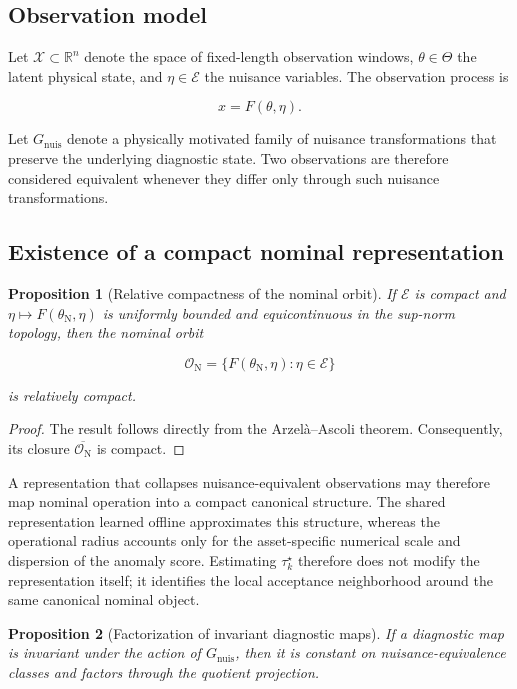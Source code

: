 \documentclass[11pt,a4paper]{article}
\newtheorem{proposition}{Proposition}
\newcommand{\X}{\ensuremath{\mathcal{X}}}
\newcommand{\ThetaSpace}{\ensuremath{\Theta}}
\newcommand{\EtaSpace}{\ensuremath{\mathcal{E}}}
\newcommand{\Gnuis}{\ensuremath{G_{\mathrm{nuis}}}}
\begin{document}
\subsection{Observation model}

Let $\X\subset\mathbb{R}^{n}$ denote the space of fixed-length observation windows,
$\theta\in\ThetaSpace$ the latent physical state, and
$\eta\in\EtaSpace$ the nuisance variables. The observation process is

\begin{equation}
x = F(\theta,\eta).
\end{equation}

Let $\Gnuis$ denote a physically motivated family of nuisance transformations that preserve the
underlying diagnostic state. Two observations are therefore considered equivalent whenever they
differ only through such nuisance transformations.

\subsection{Existence of a compact nominal representation}

\begin{proposition}[Relative compactness of the nominal orbit]
If $\EtaSpace$ is compact and
$\eta\mapsto F(\theta_{\mathrm N},\eta)$ is uniformly bounded and
equicontinuous in the sup-norm topology, then the nominal orbit

\[
\mathcal{O}_{\mathrm N}
=
\{F(\theta_{\mathrm N},\eta):\eta\in\EtaSpace\}
\]

is relatively compact.
\end{proposition}

\begin{proof}
The result follows directly from the Arzel\`a--Ascoli theorem. Consequently,
its closure $\overline{\mathcal{O}_{\mathrm N}}$ is compact.
\end{proof}

A representation that collapses nuisance-equivalent observations may therefore map nominal
operation into a compact canonical structure. The shared representation learned offline
approximates this structure, whereas the operational radius accounts only for the
asset-specific numerical scale and dispersion of the anomaly score. Estimating
$\tau_k^\star$ therefore does not modify the representation itself; it identifies the local
acceptance neighborhood around the same canonical nominal object.

\begin{proposition}[Factorization of invariant diagnostic maps]
If a diagnostic map is invariant under the action of $\Gnuis$, then it is constant on
nuisance-equivalence classes and factors through the quotient projection.
\end{proposition}
\end{document}

